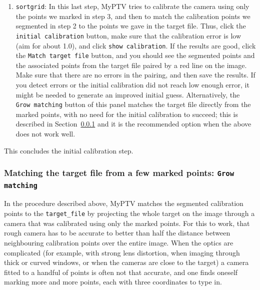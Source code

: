 \documentclass[10pt,a4paper]{article}
\begin{document}
\begin{enumerate}
	\item \texttt{sortgrid}: In this last step, MyPTV tries to calibrate the camera using only the points we marked in step 3, and then to match the calibration points we segmented in step 2 to the points we gave in the target file. Thus, click the \texttt{initial calibration} button, make sure that the calibration error is low (aim for about 1.0), and click \texttt{show calibration}. If the results are good, click the \texttt{Match target file} button, and you should see the segmented points and the associated points from the target file paired by a red line on the image. Make sure that there are no errors in the pairing, and then save the results. If you detect errors or the initial calibration did not reach low enough error, it might be needed to generate an improved initial guess.  Alternatively, the \texttt{Grow matching} button of this panel matches the target file directly from the marked points, with no need for the initial calibration to succeed; this is described in Section~\ref{sec:grow_matching} and it is the recommended option when the above does not work well.
		 
\end{enumerate}


This concludes the initial calibration step.




\subsubsection{Matching the target file from a few marked points: \texttt{Grow matching}}\label{sec:grow_matching}

In the procedure described above, MyPTV matches the segmented calibration points to the \texttt{target\_file} by projecting the whole target on the image through a camera that was calibrated using only the marked points. For this to work, that rough camera has to be accurate to better than half the distance between neighbouring calibration points over the entire image. When the optics are complicated (for example, with strong lens distortion, when imaging through thick or curved windows, or when the cameras are close to the target) a camera fitted to a handful of points is often not that accurate, and one finds oneself marking more and more points, each with three coordinates to type in.
\end{document}
